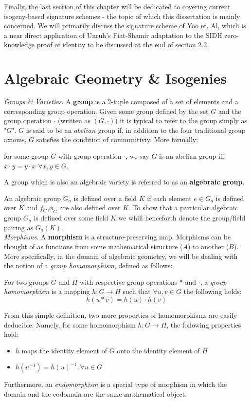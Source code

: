 Finally, the last section of this chapter will be dedicated to covering current isogeny-based signature schemes - the topic of which this dissertation is mainly concerned. We will primarily discuss the signature scheme of Yoo et. Al, which is a near direct application of Unruh's Fiat-Shamir adaptation to the SIDH zero-knowledge proof of identity to be discussed at the end of section 2.2.\\

\section{Algebraic Geometry \& Isogenies}
\emph{Groups \& Varieties}. A \textbf{group} is a 2-tuple composed of a set of elements and a corresponding group operation. Given some group defined by the set $G$ and the group operation $\cdot$ (written as $(G,\cdot)$) it is typical to refer to the group simply as "$G$". $G$ is said to be an $abelian$ group if, in addition to the four traditional group axioms, $G$ satisfies the condition of commutitiviy. More formally: 
\begin{definition}
\label{defn:abeliangroup}
for some group $G$ with group operation $\cdot$, we say $G$ is an abelian group iff $x \cdot y = y \cdot x$ $\forall x, y \in G$. 
\end{definition}
A group which is also an algebraic variety is referred to as an \textbf{algebraic group}.

An algebraic group $G_a$ is defined over a field $K$ if each element $e \in G_a$ is defined over $K$ and $f_G$,$\phi_G$ are also defined over $K$. To show that a particular algebraic group $G_a$ is defined over some field $K$ we whill henceforth denote the group/field pairing as $G_a(K)$.\\

\noindent
\emph{Morphisms}. A \textbf{morphism} is a structure-preserving map. Morphisms can be thought of as functions from some mathematical structure ($A$) to another ($B$). More specifically, in the domain of algebraic geometry, we will be dealing with the notion of a \emph{group homomorphism}, defined as follows:
\begin{definition}
\label{defn:homomorphism}
For two groups $G$ and $H$ with respective group operations $*$ and $\cdot$, a \emph{group homomorphism} is a mapping $h: G \rightarrow H$ such that $\forall u, v \in G$ the following holds:
$$h(u * v) = h(u) \cdot h(v)$$
\end{definition}
From this simple definition, two more properties of homomorphisms are easily deducible. Namely, for some homomorphism $h: G \rightarrow H$, the following properties hold:
\begin{itemize}
\item $h$ maps the identity element of $G$ onto the identity element of $H$
\item $h(u^{-1}) = h(u)^{-1}, \forall u \in G$
\end{itemize}
Furthermore, an \emph{endomorphism} is a special type of morphism in which the domain and the codomain are the same mathematical object.\\

